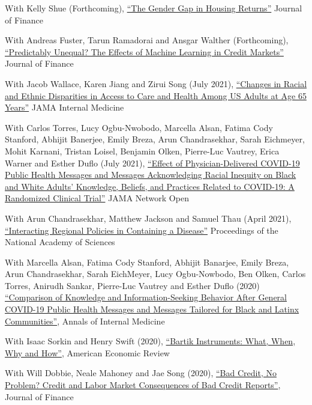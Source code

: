 \documentclass[letterpaper]{article}
\renewenvironment{itemize}{
  \begin{list}{}
    { \setlength{\itemsep}{5pt}
      \setlength{\parsep}{0pt}
      \setlength{\topsep}{0pt}
      \setlength{\leftmargin}{0em} } }{
  \end{list}}
\begin{document}
\begin{itemize}

\item With Kelly Shue (Forthcoming), \href{https://paulgp.github.io/papers/Gender_Gap_in_Housing_Returns.pdf}{``The Gender Gap in Housing Returns''} Journal of Finance
\item With Andreas Fuster, Tarun Ramadorai and Ansgar Walther (Forthcoming), \href{https://papers.ssrn.com/sol3/papers.cfm?abstract_id=3072038}{``Predictably Unequal? The Effects of Machine Learning in Credit Markets''} Journal of Finance
\item With Jacob Wallace, Karen Jiang and Zirui Song (July 2021), \href{https://jamanetwork.com/journals/jamainternalmedicine/article-abstract/2782345}{``Changes in Racial and Ethnic Disparities in Access to Care and Health Among US Adults at Age 65 Years''} JAMA Internal Medicine
\item With Carlos Torres, Lucy Ogbu-Nwobodo, Marcella Alsan, Fatima Cody Stanford, Abhijit Banerjee, Emily Breza, Arun Chandrasekhar, Sarah Eichmeyer, Mohit Karnani, Tristan Loisel, Benjamin Olken, Pierre-Luc Vautrey, Erica Warner and Esther Duflo (July 2021), \href{https://jamanetwork.com/journals/jamanetworkopen/fullarticle/2781934}{``Effect of Physician-Delivered COVID-19 Public Health Messages and Messages Acknowledging Racial Inequity on Black and White Adults’ Knowledge, Beliefs, and Practices Related to COVID-19: A Randomized Clinical Trial''} JAMA Network Open
\item With Arun Chandrasekhar, Matthew Jackson and Samuel Thau (April 2021), \href{https://arxiv.org/abs/2008.10745}{``Interacting Regional Policies in Containing a Disease''} Proceedings of the National Academy of Sciences
\item With Marcella Alsan, Fatima Cody Stanford, Abhijit Banarjee, Emily Breza, Arun Chandrasekhar, Sarah EichMeyer, Lucy Ogbu-Nowbodo, Ben Olken, Carlos Torres, Anirudh Sankar, Pierre-Luc Vautrey and Esther Duflo (2020) \href{https://www.acpjournals.org/doi/10.7326/M20-6141}{``Comparison of Knowledge and Information-Seeking Behavior After General COVID-19 Public Health Messages and Messages Tailored for Black and Latinx Communities''}, Annals of Internal Medicine
\item With Isaac Sorkin and Henry Swift (2020), \href{http://paulgp.github.io/papers/bartik_gpss.pdf}{``Bartik Instruments: What, When, Why and How''}, American Economic Review
\item With Will Dobbie, Neale Mahoney and Jae Song (2020), \href{https://papers.ssrn.com/sol3/papers.cfm?abstract_id=2844316}{``Bad Credit, No Problem? Credit and Labor Market Consequences of Bad Credit Reports''}, Journal of Finance

\end{itemize}
\end{document}
